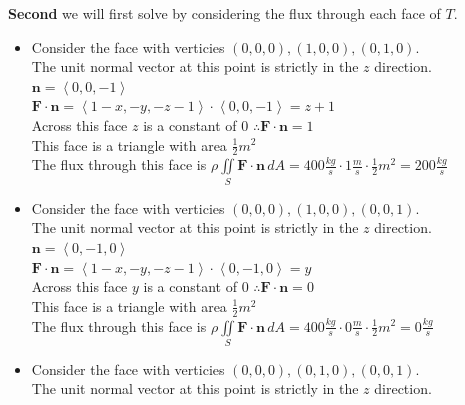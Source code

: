 \documentclass[10pt]{article}
\begin{document}
\noindent
\textbf{Second} we will first solve by considering the flux through each face of $ T $. \\

\begin{itemize}
    \item Consider the face with verticies $ (0,0,0), (1,0,0), (0,1,0) $. \\
    \subitem The unit normal vector at this point is strictly in the $ z $ direction. \\
    \subitem $ \displaystyle \textbf{n} = \left< 0,0,-1 \right> $ \\
    \subitem $ \displaystyle \textbf{F} \cdot \textbf{n} = \left<1-x,-y,-z-1\right> \cdot \left< 0,0,-1 \right> = z + 1 $ \\
    \subitem Across this face $ z $ is a constant of 0 $ \therefore \textbf{F} \cdot \textbf{n} = 1 $ \\
    \subitem This face is a triangle with area $ \displaystyle \frac{1}{2}m^2 $ \\
    \subitem The flux through this face is $ \displaystyle \rho \iint \limits_{S} \textbf{F} \cdot \textbf{n} \, dA = 400\tfrac{kg}{s} \cdot 1\tfrac{m}{s} \cdot \frac{1}{2}m^2 = 200\tfrac{kg}{s} $ \\
    \item Consider the face with verticies $ (0,0,0), (1,0,0), (0,0,1) $. \\
    \subitem The unit normal vector at this point is strictly in the $ z $ direction. \\
    \subitem $ \displaystyle \textbf{n} = \left< 0,-1,0 \right> $ \\
    \subitem $ \displaystyle \textbf{F} \cdot \textbf{n} = \left<1-x,-y,-z-1\right> \cdot \left< 0,-1,0 \right> = y $ \\
    \subitem Across this face $ y $ is a constant of 0 $ \therefore \textbf{F} \cdot \textbf{n} = 0 $ \\
    \subitem This face is a triangle with area $ \displaystyle \frac{1}{2}m^2 $ \\
    \subitem The flux through this face is $ \displaystyle \rho \iint \limits_{S} \textbf{F} \cdot \textbf{n} \, dA = 400\tfrac{kg}{s} \cdot 0\tfrac{m}{s} \cdot \frac{1}{2}m^2 = 0\tfrac{kg}{s} $ \\
    \item Consider the face with verticies $ (0,0,0), (0,1,0), (0,0,1) $. \\
    \subitem The unit normal vector at this point is strictly in the $ z $ direction. \\

\end{itemize}
\end{document}
